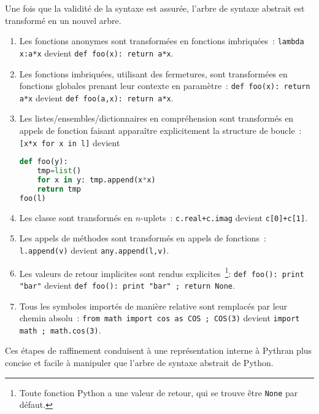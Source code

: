 \documentclass[renpar]{compas2013}
\begin{document}
Une fois que la validité de la syntaxe est assurée, l'arbre de syntaxe
abstrait est transformé en un nouvel arbre.
\begin{enumerate}

  \item Les fonctions anonymes sont transformées en fonctions imbriquées~:
	\texttt{lambda x:a*x} devient \texttt{def foo(x): return a*x}.

  \item Les fonctions imbriquées, utilisant des fermetures, sont
	transformées en fonctions globales prenant leur contexte en
	paramètre~: \texttt{def foo(x): return a*x} devient \texttt{def
	foo(a,x): return a*x}.

  \item Les listes/ensembles/dictionnaires en compréhension sont
	transformés en appels de fonction faisant apparaître explicitement la
	structure de boucle~:\texttt{[x*x for x in l]} devient
\begin{lstlisting}[language=python]
def foo(y):
	tmp=list()
	for x in y: tmp.append(x*x)
	return tmp
foo(l)
\end{lstlisting}

  \item Les classe sont transformés en $n$-uplets~:
	\texttt{c.real+c.imag} devient \texttt{c[0]+c[1]}.

  \item Les appels de méthodes sont transformés en appels de fonctions~:
	\texttt{l.append(v)} devient \texttt{any.append(l,v)}.

  \item Les valeurs de retour implicites sont rendus
	explicites~\footnote{Toute fonction Python a une valeur de retour, qui
	se trouve être \texttt{None} par défaut.}: \texttt{def foo(): print
	"bar"} devient \texttt{def foo(): print "bar" ; return None}.

  \item Tous les symboles importés de manière relative sont remplacés par
	leur chemin absolu~: \texttt{from math import cos as COS ; COS(3)}
	devient \texttt{import math ; math.cos(3)}.

\end{enumerate}

Ces étapes de raffinement conduisent à une représentation interne à
Pythran plus concise et facile à manipuler que l'arbre de syntaxe abstrait
de Python. 
\end{document}
